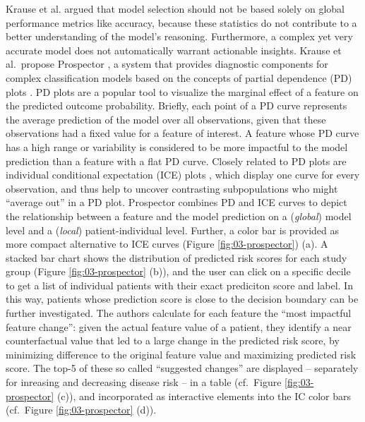 \documentclass[
  oneside]{book}
\begin{document}
Krause et al. \autocite{Krause:Prospector2016} argued that model selection should not be based solely on global performance metrics like accuracy, because these statistics do not contribute to a better understanding of the model's reasoning.
Furthermore, a complex yet very accurate model does not automatically warrant actionable insights.
Krause et al.~propose Prospector \autocite{Krause:Prospector2016}, a system that provides diagnostic components for complex classification models based on the concepts of partial dependence (PD) plots \autocite{Friedman:PDP2001}.
PD plots are a popular tool to visualize the marginal effect of a feature on the predicted outcome probability.
Briefly, each point of a PD curve represents the average prediction of the model over all observations, given that these observations had a fixed value for a feature of interest.
A feature whose PD curve has a high range or variability is considered to be more impactful to the model prediction than a feature with a flat PD curve.
Closely related to PD plots are individual conditional expectation (ICE) plots \autocite{Goldstein:ICE2015}, which display one curve for every observation, and thus help to uncover contrasting subpopulations who might ``average out'' in a PD plot.
Prospector combines PD and ICE curves to depict the relationship between a feature and the model prediction on a (\emph{global}) model level and a (\emph{local}) patient-individual level.
Further, a color bar is provided as more compact alternative to ICE curves (Figure \ref{fig:03-prospector}) (a).
A stacked bar chart shows the distribution of predicted risk scores for each study group (Figure \ref{fig:03-prospector} (b)), and the user can click on a specific decile to get a list of individual patients with their exact prediciton score and label.
In this way, patients whose prediction score is close to the decision boundary can be further investigated.
The authors calculate for each feature the ``most impactful feature change'': given the actual feature value of a patient, they identify a near counterfactual value that led to a large change in the predicted risk score, by minimizing difference to the original feature value and maximizing predicted risk score.
The top-5 of these so called ``suggested changes'' are displayed -- separately for inreasing and decreasing disease risk -- in a table (cf.~Figure \ref{fig:03-prospector} (c)), and incorporated as interactive elements into the IC color bars (cf.~Figure \ref{fig:03-prospector} (d)).
\end{document}
